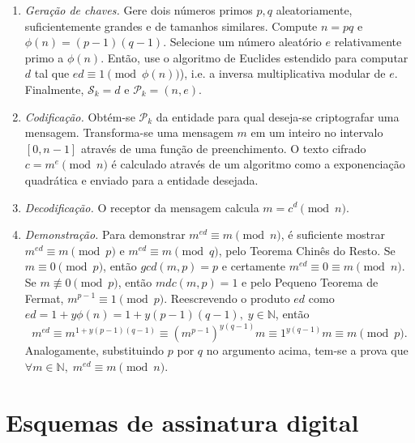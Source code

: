 \documentclass[12pt]{report}
\newcommand{\pk}{$\mathcal{P}_k$}
\begin{document}
\begin{enumerate}

  \item[] \emph{Geração de chaves.} Gere dois números primos $p, q$
    aleatoriamente, suficientemente grandes e de tamanhos similares. Compute
    $n = p q$ e $\phi(n) = (p - 1) (q - 1)$. Selecione um número aleatório $e$
    relativamente primo a $\phi(n)$. Então, use o algoritmo de Euclides
    estendido para computar $d$ tal que $ed \equiv 1 \pmod{\phi(n)}$), i.e.
    a inversa multiplicativa modular de $e$. Finalmente, $\mathcal{S}_k = d$ e
    $\mathcal{P}_k = (n, e)$.

  \item[] \emph{Codificação.} Obtém-se \pk{} da entidade para qual
    deseja-se criptografar uma mensagem. Transforma-se uma mensagem $m$ em um
    inteiro no intervalo $[0, n - 1]$ através de uma função de preenchimento.
    O texto cifrado $c = m^e \pmod{n}$ é calculado através de um algoritmo
    como a exponenciação quadrática e enviado para a entidade desejada.

  \item[] \emph{Decodificação.} O receptor da mensagem calcula $m = c^d
    \pmod{n}$.

  \item[] \emph{Demonstração.} Para demonstrar $m^{ed} \equiv m \pmod{n}$, é
    suficiente mostrar $m^{ed} \equiv m \pmod{p}$ e $m^{ed} \equiv m \pmod{q}$,
    pelo Teorema Chinês do Resto. Se $m \equiv 0 \pmod{p}$, então
    $gcd(m, p) = p$ e certamente $m^{ed} \equiv 0 \equiv m \pmod{n}$.
    Se $m \not\equiv 0 \pmod{p}$, então $mdc(m, p) = 1$ e pelo Pequeno Teorema
    de Fermat, $m^{p - 1} \equiv 1 \pmod{p}$. Reescrevendo o produto $ed$ como
    $ed = 1 + y\phi(n) = 1 + y(p - 1)(q - 1), \; y \in \mathbb{N}$, então
    \begin{equation}
      m^{ed} \equiv m^{1 + y(p-1)(q-1)} \equiv (m^{p-1})^{y(q-1)}m
        \equiv 1^{y(q-1)}m \equiv m \pmod{p}.
    \end{equation}
    Analogamente, substituindo $p$ por $q$ no argumento acima, tem-se a prova
    que $\forall m \in \mathbb{N}, \; m^{ed} \equiv m \pmod{n}$.

\end{enumerate}

\section{Esquemas de assinatura digital}
\end{document}
